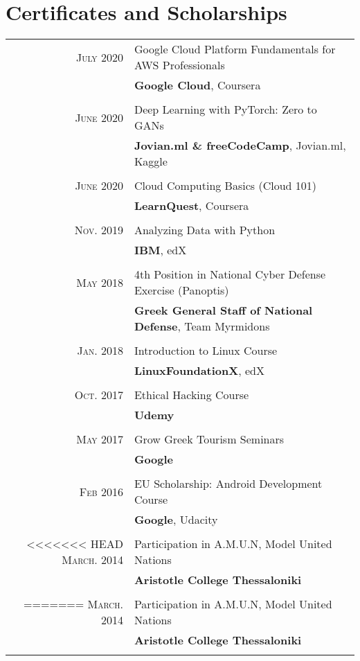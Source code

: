 \documentclass[a4paper,10pt]{article}
\begin{document}
{\section{Certificates and Scholarships}
\begin{tabular}{rl}
    \textsc{July} 2020 & Google Cloud Platform Fundamentals for AWS Professionals \\& \textbf{Google Cloud}, Coursera \\ \\ 
    \textsc{June} 2020 & Deep Learning with PyTorch: Zero to GANs \\& \textbf{Jovian.ml \& freeCodeCamp}, Jovian.ml, Kaggle \\ \\
    \textsc{June} 2020 & Cloud Computing Basics (Cloud 101) \\& \textbf{LearnQuest}, Coursera \\ \\
    \textsc{Nov.} 2019 & Analyzing Data with Python \\& \textbf{IBM}, edX \\ \\
    \textsc{May} 2018 & 4th Position in National Cyber Defense Exercise (Panoptis)  \\& \textbf{Greek General Staff of National Defense}, Team Myrmidons \\ \\
    \textsc{Jan.} 2018 & Introduction to Linux Course\\& \textbf{LinuxFoundationX}, edX \\ \\
    \textsc{Oct.} 2017 & Ethical Hacking Course \\& \textbf{Udemy} \\ \\
    \textsc{May} 2017 & Grow Greek Tourism Seminars \\& \textbf{Google} \\ \\ 
    \textsc{Feb} 2016 & EU Scholarship: Android Development Course \\& \textbf{Google}, Udacity \\ \\
<<<<<<< HEAD
    \textsc{March.} 2014 & Participation in A.M.U.N, Model United Nations \\& \textbf{Aristotle College Thessaloniki} \\ \\ 
=======
    \textsc{March.} 2014 & Participation in A.M.U.N, Model United Nations \\& \textbf{Aristotle College Thessaloniki} \\ \\

\end{tabular}}
\end{document}
